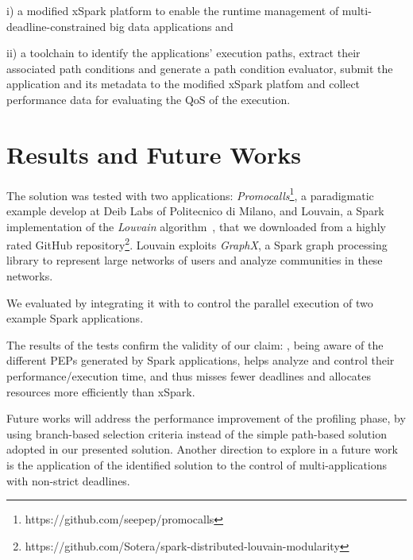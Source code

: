  i) a modified xSpark platform to enable the runtime management of multi-\plan deadline-constrained big data applications and 
 
 ii) a toolchain to identify the applications' execution paths,  extract their associated path conditions and generate a path condition evaluator, submit the application and its metadata to the modified xSpark platfom and collect performance data for evaluating the QoS of the execution. 

\section*{Results and Future Works}\label{sec:results_future_works}
The solution was tested with two applications:  \textit{Promocalls}\footnote{https://github.com/seepep/promocalls}, a paradigmatic example  develop at Deib Labs of Politecnico di Milano, and Louvain, a Spark implementation of the \textit{Louvain} algorithm~\cite{Louvain}, that we downloaded from a highly rated GitHub repository\footnote{https://github.com/Sotera/spark-distributed-louvain-modularity}. Louvain exploits \textit{GraphX}, a Spark graph processing library to represent large networks of users and analyze communities in these networks. 

We evaluated  \dSymb by integrating it with \cSpark to control the parallel execution of two example Spark applications. 



The results of the tests confirm the validity of our claim: \tool, being aware of the different PEPs generated by Spark applications, helps analyze and control their performance/execution time, and thus misses fewer deadlines and allocates resources more efficiently than xSpark.

Future works will address the performance improvement of the profiling phase, by using branch-based selection criteria instead of the simple path-based solution adopted in our presented solution. Another direction to explore in a future work is the application of the identified solution to the control of multi-\plan applications with non-strict deadlines.

